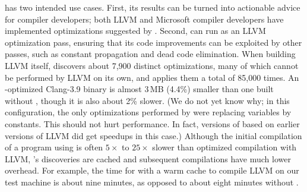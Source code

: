 \tool{} has two intended use cases.
%
First, its results can be turned into actionable advice for compiler
developers; both LLVM and Microsoft compiler developers have
implemented optimizations suggested by \tool{}.
%
Second, \tool{} can run as an LLVM optimization pass, ensuring that
its code improvements can be exploited by other passes, such as
constant propagation and dead code elimination.
%
When building LLVM itself, \tool{} discovers about 7,900 distinct
optimizations, many of which cannot be performed by LLVM on its own,
and applies them a total of 85,000 times.
%
An \tool-optimized Clang-3.9 binary is almost 3\,MB (4.4\%) smaller
than one built without \tool, though it is also about 2\% slower.
%
(We do not yet know why; in this configuration, the only optimizations
performed by \tool{} were replacing variables by constants. This
should not hurt performance. In fact, versions of \tool{} based on
earlier versions of LLVM did get speedups in this case.)
%
Although the initial compilation of a program using \tool{} is often
$5\times$ to $25\times$ slower than optimized compilation with LLVM,
\tool{}'s discoveries are cached and subsequent compilations have much
lower overhead.
%
For example, the time for \tool{} with a warm cache to compile
LLVM on our test machine is about nine minutes, as opposed to
about eight minutes without \tool{}.
